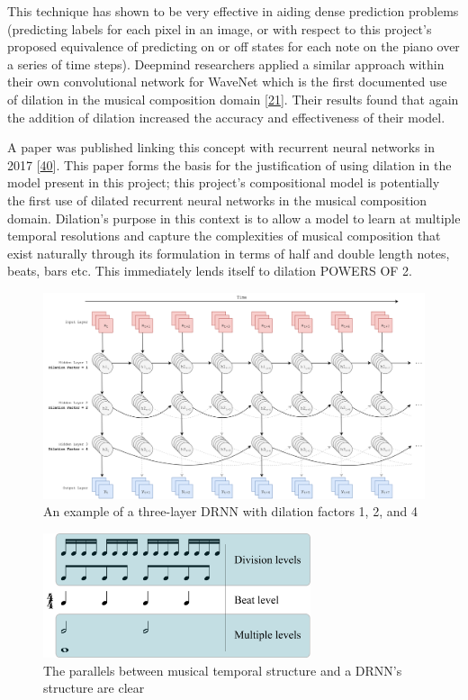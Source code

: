 \documentclass[12pt,]{article}
\begin{document}
This technique has shown to be very effective in aiding dense prediction
problems (predicting labels for each pixel in an image, or with respect
to this project's proposed equivalence of predicting on or off states
for each note on the piano over a series of time steps). Deepmind
researchers applied a similar approach within their own convolutional
network for WaveNet which is the first documented use of dilation in the
musical composition domain
{[}\protect\hyperlink{ref-oord2016wavenet}{21}{]}. Their results found
that again the addition of dilation increased the accuracy and
effectiveness of their model.

A paper was published linking this concept with recurrent neural
networks in 2017 {[}\protect\hyperlink{ref-chang2017dilated}{40}{]}.
This paper forms the basis for the justification of using dilation in
the model present in this project; this project's compositional model is
potentially the first use of dilated recurrent neural networks in the
musical composition domain. Dilation's purpose in this context is to
allow a model to learn at multiple temporal resolutions and capture the
complexities of musical composition that exist naturally through its
formulation in terms of half and double length notes, beats, bars etc.
This immediately lends itself to dilation POWERS OF 2.

\begin{figure}
\centering
\includegraphics[width=1\textwidth,height=\textheight]{Images/dilatedrnn.png}
\caption{An example of a three-layer DRNN with dilation factors 1, 2,
and 4}
\end{figure}

\begin{figure}
\centering
\includegraphics[width=0.7\textwidth,height=\textheight]{Images/Metric_levels.png}
\caption{The parallels between musical temporal structure and a DRNN's
structure are clear}
\end{figure}
\end{document}
